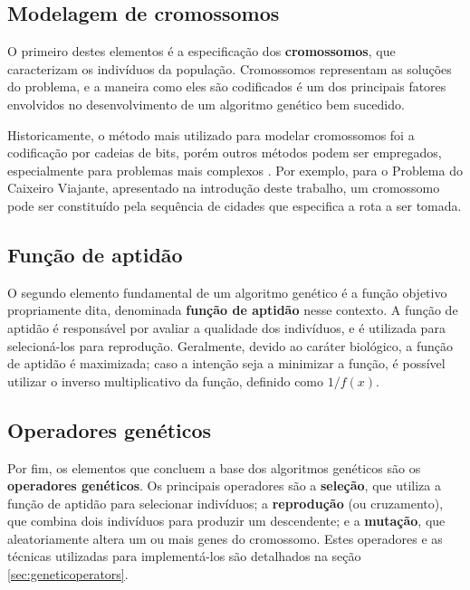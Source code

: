 \documentclass[12pt]{article}
\begin{document}
\subsection{Modelagem de cromossomos} \label{sec:chromosomes}

O primeiro destes elementos é a especificação dos \textbf{cromossomos}, que caracterizam os indivíduos da população. Cromossomos representam as soluções do problema, e a maneira como eles são codificados é um dos principais fatores envolvidos no desenvolvimento de um algoritmo genético bem sucedido.

Historicamente, o método mais utilizado para modelar cromossomos foi a codificação por cadeias de bits, porém outros métodos podem ser empregados, especialmente para problemas mais complexos \cite{Mitchell1998}. Por exemplo, para o Problema do Caixeiro Viajante, apresentado na introdução deste trabalho, um cromossomo pode ser constituído pela sequência de cidades que especifica a rota a ser tomada.

\subsection{Função de aptidão} \label{sec:fitnessfunction}

O segundo elemento fundamental de um algoritmo genético é a função objetivo propriamente dita, denominada \textbf{função de aptidão} nesse contexto. A função de aptidão é responsável por avaliar a qualidade dos indivíduos, e é utilizada para selecioná-los para reprodução. Geralmente, devido ao caráter biológico, a função de aptidão é maximizada; caso a intenção seja a minimizar a função, é possível utilizar o inverso multiplicativo da função, definido como $1 / f(x)$.

\subsection{Operadores genéticos} \label{sec:operatorsbrief}

Por fim, os elementos que concluem a base dos algoritmos genéticos são os \textbf{operadores genéticos}. Os principais operadores são a \textbf{seleção}, que utiliza a função de aptidão para selecionar indivíduos; a \textbf{reprodução} (ou cruzamento), que combina dois indivíduos para produzir um descendente; e a \textbf{mutação}, que aleatoriamente altera um ou mais genes do cromossomo. Estes operadores e as técnicas utilizadas para implementá-los são detalhados na seção \ref{sec:geneticoperators}.
\end{document}
